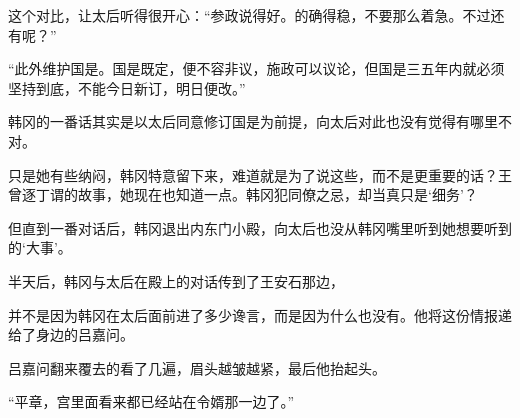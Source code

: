 这个对比，让太后听得很开心：“参政说得好。的确得稳，不要那么着急。不过还有呢？”

“此外维护国是。国是既定，便不容非议，施政可以议论，但国是三五年内就必须坚持到底，不能今日新订，明日便改。”

韩冈的一番话其实是以太后同意修订国是为前提，向太后对此也没有觉得有哪里不对。

只是她有些纳闷，韩冈特意留下来，难道就是为了说这些，而不是更重要的话？王曾逐丁谓的故事，她现在也知道一点。韩冈犯同僚之忌，却当真只是‘细务’？

但直到一番对话后，韩冈退出内东门小殿，向太后也没从韩冈嘴里听到她想要听到的‘大事’。

半天后，韩冈与太后在殿上的对话传到了王安石那边，

并不是因为韩冈在太后面前进了多少谗言，而是因为什么也没有。他将这份情报递给了身边的吕嘉问。

吕嘉问翻来覆去的看了几遍，眉头越皱越紧，最后他抬起头。

“平章，宫里面看来都已经站在令婿那一边了。”
